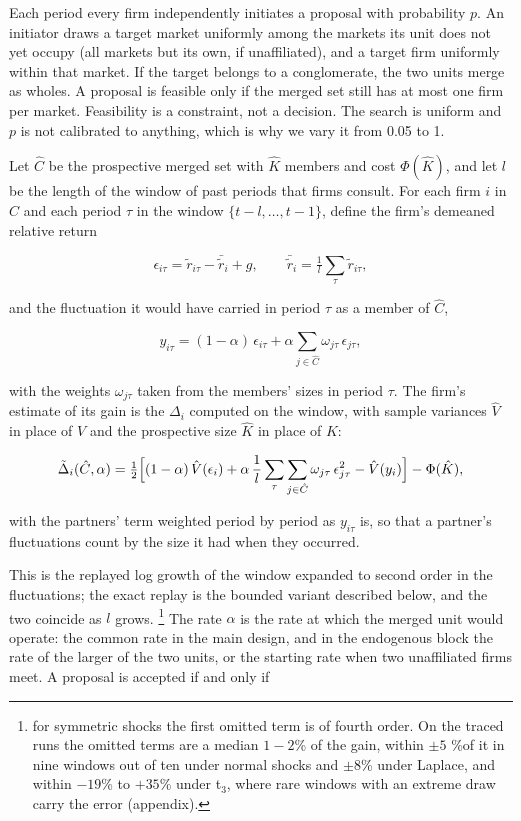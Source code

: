 \documentclass[12pt,a4paper]{article}
\begin{document}
Each period every firm independently initiates a proposal with probability $p$. An initiator draws a target market uniformly among the markets its unit does not yet occupy (all markets but its own, if unaffiliated), and a target firm uniformly within that market. If the target belongs to a conglomerate, the two units merge as wholes. A proposal is feasible only if the merged set still has at most one firm per market. Feasibility is a constraint, not a decision. The search is uniform and $p$ is not calibrated to anything, which is why we vary it from 0.05 to 1.

Let $\hat{C}$ be the prospective merged set with $\hat{K}$ members and cost $\Phi(\hat{K})$, and let $l$ be the length of the window of past periods that firms consult. For each firm $i$ in $\hat{C}$ and each period $\tau$ in the window $\{t - l, \ldots, t - 1\}$, define the firm's demeaned relative return

$$\epsilon_{i\tau} = \tilde r_{i\tau} - \bar{\tilde r}_i + g, \qquad \bar{\tilde r}_i = \tfrac{1}{l}\textstyle\sum_{\tau} \tilde r_{i\tau},$$

and the fluctuation it would have carried in period $\tau$ as a member of $\hat{C}$,

$$y_{i\tau} = (1-\alpha)\,\epsilon_{i\tau} + \alpha \sum_{j \in \hat C} \omega_{j\tau}\,\epsilon_{j\tau},$$

with the weights $\omega_{j\tau}$ taken from the members' sizes in period $\tau$. The firm's estimate of its gain is the $\Delta_{i}$ computed on the window, with sample variances $\hat{V}$ in place of $V$ and the prospective size $\hat{K}$ in place of $K$:

$$\tilde\Delta_i(\hat C, \alpha) = \tfrac12 \Bigl[ (1-\alpha)\,\hat V(\epsilon_i) + \alpha\, \frac{1}{l} \sum_{\tau} \sum_{j \in \hat C} \omega_{j\tau}\,\epsilon_{j\tau}^2 - \hat V(y_i) \Bigr] - \Phi(\hat K),$$

with the partners' term weighted period by period as $y_{i\tau}$ is, so that a partner's fluctuations count by the size it had when they occurred.

This is the replayed log growth of the window expanded to second order in the fluctuations; the exact replay is the bounded variant described below, and the two coincide as $l$ grows. \footnote{for symmetric shocks the first omitted term is of fourth order. On the traced runs the omitted terms are a median $1-2$\% of the gain, within $\pm 5$ \%of it in nine windows out of ten under normal shocks and $\pm 8$\% under Laplace, and within $-19$\% to $+35$\% under t$_3$, where rare windows with an extreme draw carry the error (appendix).} The rate $\alpha$ is the rate at which the merged unit would operate: the common rate in the main design, and in the endogenous block the rate of the larger of the two units, or the starting rate when two unaffiliated firms meet. A proposal is accepted if and only if
\end{document}
